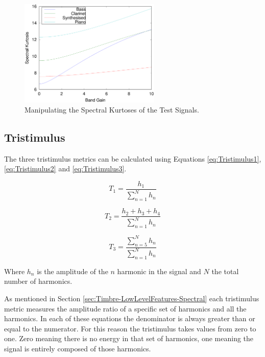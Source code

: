 			\begin{figure}[h!]
				\centering
				\includegraphics[width=0.6\textwidth]{chapter6/Images/MoveKurtoses.eps}
				\caption{Manipulating the Spectral Kurtoses of the Test Signals.}
				\label{fig:MoveKurtoses}
			\end{figure}

	\subsection{Tristimulus}
	\label{sec:FeatureControl-Parameterisation-Tristimulus}
		The three tristimulus metrics can be calculated using Equations \ref{eq:Tristimulus1},
		\ref{eq:Tristimulus2} and \ref{eq:Tristimulus3}.
		
		\begin{equation}
			T_{1} = \frac{h_{1}}{\sum_{n = 1}^{N} h_{n}}
			\label{eq:Tristimulus1}
		\end{equation}

		\begin{equation}
			T_{2} = \frac{h_{2} + h_{3} + h_{4}}{\sum_{n = 1}^{N} h_{n}}
			\label{eq:Tristimulus2}
		\end{equation}

		\begin{equation}
			T_{3} = \frac{\sum_{n = 5}^{N} h_{n}}{\sum_{n = 1}^{N} h_{n}}
			\label{eq:Tristimulus3}
		\end{equation}

		Where $h_{n}$ is the amplitude of the $n$ harmonic in the signal and $N$ the total number of
		harmonics.

		As mentioned in Section \ref{sec:Timbre-LowLevelFeatures-Spectral} each tristimulus metric measures the
		amplitude ratio of a specific set of harmonics and all the harmonics. In each of these equations the
		denominator is always greater than or equal to the numerator. For this reason the tristimulus takes values
		from zero to one. Zero meaning there is no energy in that set of harmonics, one meaning the signal is
		entirely composed of those harmonics.

